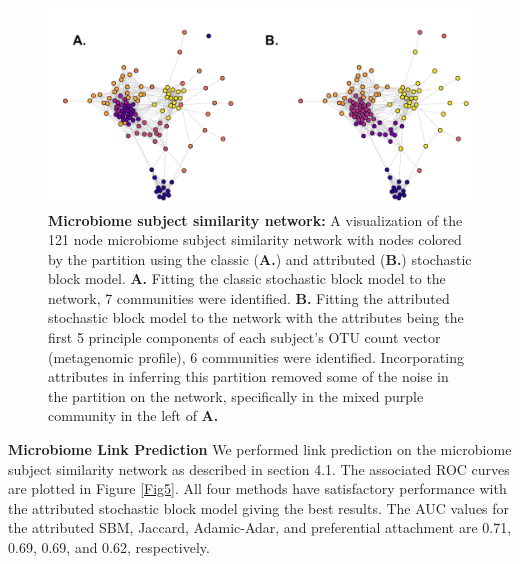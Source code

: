 \begin{figure}[h!]
\begin{center}
\includegraphics[width=1\textwidth]{MicrobiomeNets_Dec12.pdf}
\caption{{\bf Microbiome subject similarity network:} A visualization of the 121 node microbiome subject similarity network with nodes colored by the partition using the classic ({\bf A.}) and attributed ({\bf B.}) stochastic block model. {\bf A.} Fitting the classic stochastic block model to the network, 7 communities were identified. {\bf B.} Fitting the attributed stochastic block model to the network with the attributes being the first 5 principle components of each subject's OTU count vector (metagenomic profile), 6 communities were identified. Incorporating attributes in inferring this partition removed some of the noise in the partition on the network, specifically in the mixed purple community in the left of {\bf A.}}
\label{Fig4}
\end{center}
\end{figure}

{\bf Microbiome Link Prediction}
We performed link prediction on the microbiome subject similarity network as described in section 4.1. The associated ROC curves are plotted in Figure \ref{Fig5}. All four methods have satisfactory performance with the attributed stochastic block model giving the best results. The AUC values for the attributed SBM, Jaccard, Adamic-Adar, and preferential attachment are 0.71, 0.69, 0.69, and 0.62, respectively. 
 

